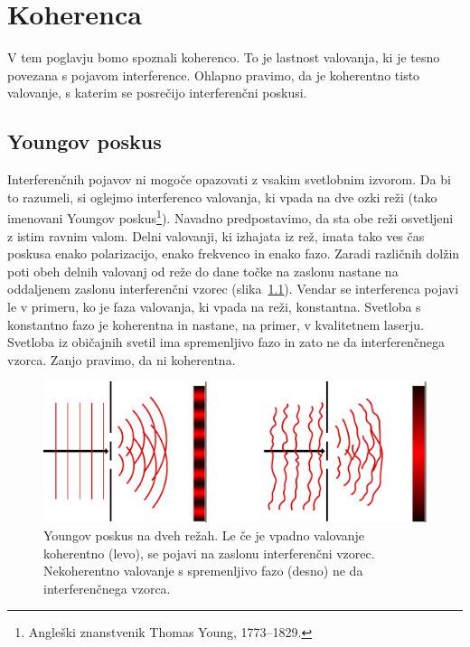 
\chapter{Koherenca}

V tem poglavju bomo spoznali koherenco. To je lastnost
valovanja, ki je tesno povezana s pojavom interference. Ohlapno pravimo,
da je koherentno tisto valovanje, s katerim se posrečijo interferenčni
poskusi.  

\section{Youngov poskus}

Interferenčnih pojavov ni mogoče opazovati z
vsakim svetlobnim izvorom. Da bi to razumeli, si oglejmo interferenco
valovanja, ki vpada na dve ozki reži (tako imenovani Youngov 
poskus\footnote{Angleški znanstvenik Thomas Young, 1773--1829.}). 
Navadno predpostavimo, da
sta obe reži osvetljeni z istim ravnim valom. Delni valovanji, ki
izhajata iz rež, imata tako ves čas poskusa enako polarizacijo, enako
frekvenco in enako fazo. Zaradi različnih dolžin poti obeh
delnih valovanj od reže do dane točke na zaslonu nastane na oddaljenem
zaslonu interferenčni vzorec (slika~\ref{fig:Young}). Vendar se  
interferenca pojavi le v primeru,
ko je faza valovanja, ki vpada na reži, konstantna. Svetloba s konstantno
fazo je koherentna in nastane, na primer, v kvalitetnem laserju.
Svetloba iz običajnih svetil ima spremenljivo fazo in zato ne da interferenčnega vzorca. Zanjo
pravimo, da ni koherentna. 
\begin{figure}[h]
\centering
\includegraphics[width=10truecm]{slike/02_Young.pdf}
\caption{Youngov poskus na dveh režah. Le če je vpadno valovanje koherentno (levo), 
se pojavi na zaslonu interferenčni vzorec. Nekoherentno valovanje s spremenljivo
fazo (desno) ne da interferenčnega vzorca.}
\label{fig:Young}
\end{figure}

